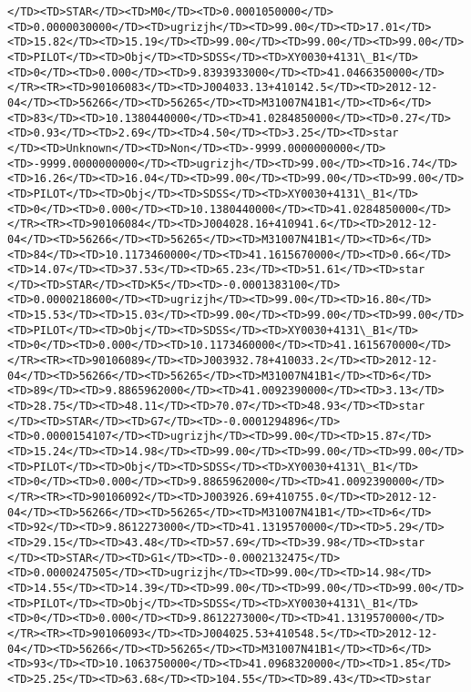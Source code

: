 \documentclass[11pt]{article}
\begin{document}
\begin{Verbatim}[commandchars=\\\{\}]
</TD><TD>STAR</TD><TD>M0</TD><TD>0.0001050000</TD><TD>0.0000030000</TD><TD>ugrizjh</TD><TD>99.00</TD><TD>17.01</TD><TD>15.82</TD><TD>15.19</TD><TD>99.00</TD><TD>99.00</TD><TD>99.00</TD><TD>PILOT</TD><TD>Obj</TD><TD>SDSS</TD><TD>XY0030+4131\_B1</TD><TD>0</TD><TD>0.000</TD><TD>9.8393933000</TD><TD>41.0466350000</TD></TR><TR><TD>90106083</TD><TD>J004033.13+410142.5</TD><TD>2012-12-04</TD><TD>56266</TD><TD>56265</TD><TD>M31007N41B1</TD><TD>6</TD><TD>83</TD><TD>10.1380440000</TD><TD>41.0284850000</TD><TD>0.27</TD><TD>0.93</TD><TD>2.69</TD><TD>4.50</TD><TD>3.25</TD><TD>star      </TD><TD>Unknown</TD><TD>Non</TD><TD>-9999.0000000000</TD><TD>-9999.0000000000</TD><TD>ugrizjh</TD><TD>99.00</TD><TD>16.74</TD><TD>16.26</TD><TD>16.04</TD><TD>99.00</TD><TD>99.00</TD><TD>99.00</TD><TD>PILOT</TD><TD>Obj</TD><TD>SDSS</TD><TD>XY0030+4131\_B1</TD><TD>0</TD><TD>0.000</TD><TD>10.1380440000</TD><TD>41.0284850000</TD></TR><TR><TD>90106084</TD><TD>J004028.16+410941.6</TD><TD>2012-12-04</TD><TD>56266</TD><TD>56265</TD><TD>M31007N41B1</TD><TD>6</TD><TD>84</TD><TD>10.1173460000</TD><TD>41.1615670000</TD><TD>0.66</TD><TD>14.07</TD><TD>37.53</TD><TD>65.23</TD><TD>51.61</TD><TD>star      </TD><TD>STAR</TD><TD>K5</TD><TD>-0.0001383100</TD><TD>0.0000218600</TD><TD>ugrizjh</TD><TD>99.00</TD><TD>16.80</TD><TD>15.53</TD><TD>15.03</TD><TD>99.00</TD><TD>99.00</TD><TD>99.00</TD><TD>PILOT</TD><TD>Obj</TD><TD>SDSS</TD><TD>XY0030+4131\_B1</TD><TD>0</TD><TD>0.000</TD><TD>10.1173460000</TD><TD>41.1615670000</TD></TR><TR><TD>90106089</TD><TD>J003932.78+410033.2</TD><TD>2012-12-04</TD><TD>56266</TD><TD>56265</TD><TD>M31007N41B1</TD><TD>6</TD><TD>89</TD><TD>9.8865962000</TD><TD>41.0092390000</TD><TD>3.13</TD><TD>28.75</TD><TD>48.11</TD><TD>70.07</TD><TD>48.93</TD><TD>star      </TD><TD>STAR</TD><TD>G7</TD><TD>-0.0001294896</TD><TD>0.0000154107</TD><TD>ugrizjh</TD><TD>99.00</TD><TD>15.87</TD><TD>15.24</TD><TD>14.98</TD><TD>99.00</TD><TD>99.00</TD><TD>99.00</TD><TD>PILOT</TD><TD>Obj</TD><TD>SDSS</TD><TD>XY0030+4131\_B1</TD><TD>0</TD><TD>0.000</TD><TD>9.8865962000</TD><TD>41.0092390000</TD></TR><TR><TD>90106092</TD><TD>J003926.69+410755.0</TD><TD>2012-12-04</TD><TD>56266</TD><TD>56265</TD><TD>M31007N41B1</TD><TD>6</TD><TD>92</TD><TD>9.8612273000</TD><TD>41.1319570000</TD><TD>5.29</TD><TD>29.15</TD><TD>43.48</TD><TD>57.69</TD><TD>39.98</TD><TD>star      </TD><TD>STAR</TD><TD>G1</TD><TD>-0.0002132475</TD><TD>0.0000247505</TD><TD>ugrizjh</TD><TD>99.00</TD><TD>14.98</TD><TD>14.55</TD><TD>14.39</TD><TD>99.00</TD><TD>99.00</TD><TD>99.00</TD><TD>PILOT</TD><TD>Obj</TD><TD>SDSS</TD><TD>XY0030+4131\_B1</TD><TD>0</TD><TD>0.000</TD><TD>9.8612273000</TD><TD>41.1319570000</TD></TR><TR><TD>90106093</TD><TD>J004025.53+410548.5</TD><TD>2012-12-04</TD><TD>56266</TD><TD>56265</TD><TD>M31007N41B1</TD><TD>6</TD><TD>93</TD><TD>10.1063750000</TD><TD>41.0968320000</TD><TD>1.85</TD><TD>25.25</TD><TD>63.68</TD><TD>104.55</TD><TD>89.43</TD><TD>star      
\end{Verbatim}
\end{document}
